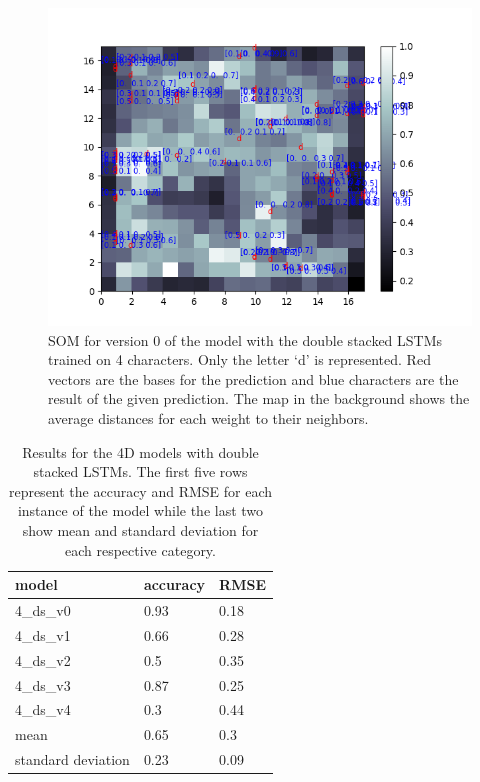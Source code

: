 \begin{figure}[!htb]
	\centering
	\includegraphics[width=\textwidth]{images/SOM_graphics/17x17_4d_ds_v0/d.png}
	\caption{SOM for version 0 of the model with the double stacked LSTMs trained on 4 characters. Only the letter `d' is represented. Red vectors are the bases for the prediction and blue characters are the result of the given prediction. The map in the background shows the average distances for each weight to their neighbors.}
	\label{fig:4d_ds_d}
\end{figure}


\begin{table}[!htb]
	\centering
	\caption{Results for the 4D models with double stacked LSTMs. The first five rows represent the accuracy and RMSE for each instance of the model while the last two show mean and standard deviation for each respective category.}
	\begin{tabularx}{\textwidth}{ X  X  X }
		\hline
		model & accuracy & RMSE \\ 
		\hline
		4\_ds\_v0 & 0.93 & 0.18\\
		4\_ds\_v1 & 0.66 & 0.28\\
		4\_ds\_v2 & 0.5 & 0.35\\
		4\_ds\_v3 & 0.87 & 0.25\\
		4\_ds\_v4 & 0.3 & 0.44\\
		\hline 
		mean & 0.65 & 0.3  \\
		standard deviation & 0.23 & 0.09 \\
		\hline
	\end{tabularx}
	\label{table:4_ds}
\end{table}


